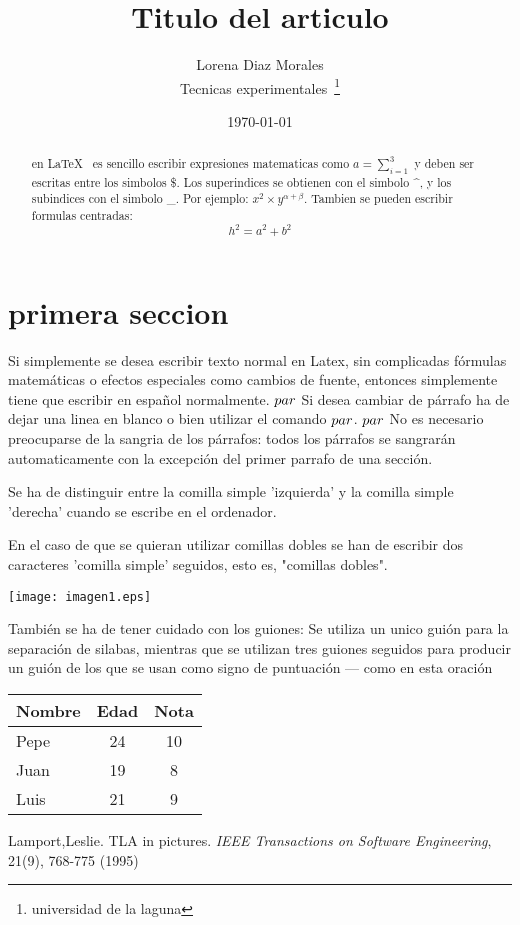 \documentclass[a4paper,12pt]{article}
\begin{document}
\title{Titulo del articulo}
\author{Lorena Diaz Morales \\
          Tecnicas experimentales~\footnote{universidad de la laguna}
                  }
\date{\today}
\maketitle
\begin{abstract}
 en \LaTeX{}~\cite{Lam:86} es sencillo escribir expresiones
 matematicas como $a=\sum_{i=1}^{3}$
 y deben ser escritas entre los simbolos \$.
 Los superindices se obtienen con el simbolo \^{}, y
 los subindices con el simbolo \_.
 Por ejemplo: $x^2\times y ^{\alpha + \beta}$.
 Tambien se pueden escribir formulas centradas:
 \[h^2=a^2+b^2\]
 \end{abstract}
 
 \section{primera seccion}
Si simplemente se desea escribir texto normal en Latex, 
sin complicadas f\'ormulas matem\'aticas o efectos especiales
como cambios de fuente, entonces simplemente tiene que escribir
en espa\~nol normalmente.
$\\par$
Si desea cambiar de párrafo ha de dejar una linea en blanco o bien
utilizar el comando $\\par$.
$\\par$
No es necesario preocuparse de la sangria de los párrafos:
todos los párrafos se sangrarán automaticamente con la excepción 
del primer parrafo de una sección.

Se ha de distinguir entre la comilla simple 'izquierda'
y la comilla simple 'derecha' cuando se escribe en el ordenador.

En el caso de que se quieran utilizar comillas dobles se han de 
escribir dos caracteres 'comilla simple' seguidos, esto es,
"comillas dobles".

\texttt{[image: imagen1.eps]}

También se ha de tener cuidado con los guiones: Se utiliza un unico
guión para la separación de silabas, mientras que se utilizan 
tres guiones seguidos para producir un guión de los que se usan
como signo de puntuación --- como en esta oración
\bigskip
\begin{tabular}{|l| c |c|}
\hline
  Nombre & Edad & Nota\\ \hline
  Pepe & 24 & 10\\ \hline
  Juan & 19 & 8\\ \hline
  Luis & 21 & 9\\ \hline
\end{tabular}
\begin{thebibliography}{00}
   Lamport,Leslie.
   TLA in pictures.
   \emph{IEEE Transactions on Software Engineering},
   21(9), 768-775
   (1995)
\end{thebibliography}   
\end{document}
